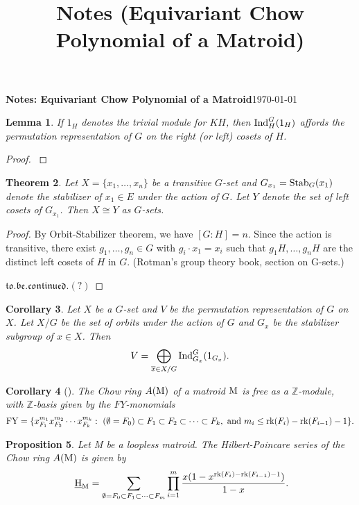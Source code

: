 \documentclass[11pt]{article}
\title{Notes (Equivariant Chow Polynomial of a Matroid)}
\newcommand{\bz}{\mathbb{Z}}
\newcommand{\ind}{\text{\normalfont Ind}}
\newcommand{\stab}{\text{\normalfont Stab}}
\newcommand{\hilbM}{\normalfont\text{ \underline{H}}_\text{M}}
\newcommand{\rank}{\normalfont\text{rk}}
\newcommand{\matM}{\normalfont\text{M}}
\newtheorem{theorem}{Theorem}
\newtheorem{corollary}[theorem]{Corollary}
\newtheorem{lemma}[theorem]{Lemma}
\newtheorem{proposition}[theorem]{Proposition}
\theoremstyle{remark}
\begin{document}
{\textbf{Notes: Equivariant Chow Polynomial of a Matroid}}\hfill {\small{\today}}

\hrulefill
\begin{lemma}
    If $1_H$ denotes the trivial module for $KH$, then $\ind_H^G(1_H)$ affords the permutation representation
    of $G$ on the right (or left) cosets of $H$.
\end{lemma}
\begin{proof}
    \cite{collins-1990}
\end{proof}

\begin{theorem}
    Let $X = \{x_1,\ldots, x_n\}$ be a transitive $G$-set and $G_{x_1} = \stab_G(x_1)$ denote the
    stabilizer of $x_1\in E$ under the action of $G$. Let $Y$ denote the set of left cosets of $G_{x_1}$.
    Then $X\cong Y$ as $G$-sets.
\end{theorem}
\begin{proof}
    By Orbit-Stabilizer theorem, we have $[G:H] = n$.
    Since the action is transitive, there exist $g_1,\ldots,g_n\in G$ with $g_i\cdot x_1 = x_i$ such that
    $g_1H,\ldots,g_nH$ are the distinct left cosets of $H$ in $G$.
    (Rotman's group theory book, section on G-sets.)

    $\mathfrak{to. be. continued.(?)}$
\end{proof}

\begin{corollary}
    Let $X$ be a $G$-set and $V$ be the permutation representation of $G$ on $X$. Let $X/G$ be the set of orbits
    under the action of $G$ and $G_x$ be the stabilizer subgroup of $x\in X$. Then
    $$V = \bigoplus_{\overline{x}\in X/G}{\ind_{G_x}^G(1_{G_x})}.$$
\end{corollary}

\hrulefill

\begin{corollary}
    [\cite{fy-2004}\cite{angarone2024chowringsmatroidspermutation}]
    The Chow ring $A(\matM)$ of a matroid $\matM$
    is free as a $\bz$-module, with $\bz$-basis given by the $FY$-monomials
            $$\text{FY}=\{x_{F_1}^{m_1}x_{F_2}^{m_2}\cdots x_{F_k}^{m_k}:\ (\emptyset = F_0)\subset
            F_1\subset F_2\subset\cdots\subset
            F_k,\ \text{and}\ m_i\leq\rank(F_i)-\rank(F_{i-1})-1 \}.$$
\end{corollary}


\begin{proposition}
    \label{prop:fy-formula}
    Let M be a loopless matroid. The Hilbert-Poincare series of the Chow ring $A(\matM)$ is given by
    $$\hilbM = \sum_{\emptyset = F_0\subset F_1\subset \cdots\subset F_m}{\prod_{i=1}^m{
        \frac{x(1-x^{\rank(F_i)-\rank(F_{i-1})-1})}{1-x}}}.$$
\end{proposition}
\end{document}
